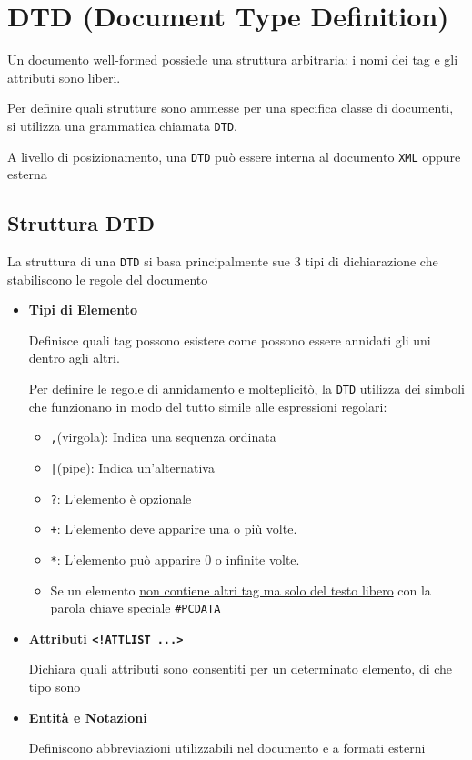 \section{DTD (Document Type Definition)}
Un documento well-formed possiede una struttura arbitraria: i nomi dei tag e gli attributi sono liberi.

Per definire quali strutture sono ammesse per una specifica classe di documenti, si utilizza una grammatica chiamata \texttt{DTD}.

A livello di posizionamento, una \texttt{DTD} può essere interna al documento \texttt{XML} oppure esterna

\subsection{Struttura DTD}
La struttura di una \texttt{DTD} si basa principalmente sue 3 tipi di dichiarazione che stabiliscono le regole del documento

\begin{itemize}
    \item \textbf{Tipi di Elemento}

    Definisce quali tag possono esistere come possono essere annidati gli uni dentro agli altri.

    Per definire le regole di annidamento e molteplicitò, la \texttt{DTD} utilizza dei simboli che funzionano in modo del tutto simile alle espressioni regolari:
    \begin{itemize}
        \item \texttt{,}(virgola): Indica una sequenza ordinata
        \item \texttt{|}(pipe): Indica un'alternativa
        \item \texttt{?}: L'elemento è opzionale
        \item \texttt{+}: L'elemento deve apparire una o più volte.
        \item \texttt{*}: L'elemento può apparire 0 o infinite volte.
        \item Se un elemento \uline{non contiene altri tag ma solo del testo libero} con la parola chiave speciale \texttt{\#PCDATA}
    \end{itemize}

    \item \textbf{Attributi \texttt{<!ATTLIST ...>}}
    
    Dichiara quali attributi sono consentiti per un determinato elemento, di che tipo sono

    \item \textbf{Entità e Notazioni}

    Definiscono abbreviazioni utilizzabili nel documento e a formati esterni
\end{itemize}

